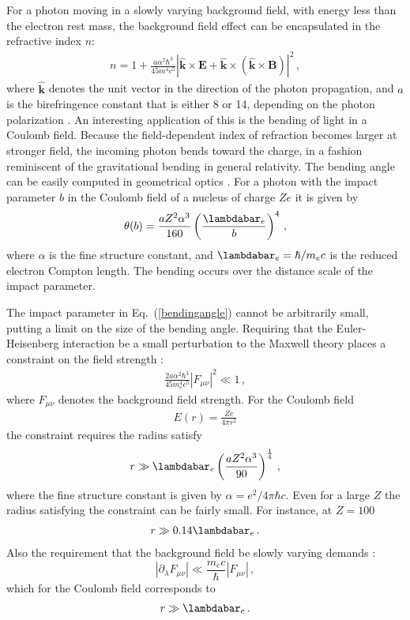 \documentclass[aps,tightenlines,preprint]{revtex4-1}
\newcommand{\bear}{\begin{eqnarray}}
\newcommand{\eear}{\end{eqnarray}}
\begin{document}
 For a 
photon  moving in a 
slowly varying background field,  with energy less than the 
electron rest mass, the background field effect can be encapsulated
in the refractive index $n$:
\bear
n=1+\frac{a\alpha^2\hbar^3}{45m^4c^5}|\bm{\hat{k}}\times 
\bm{E}+\bm{\hat{k}}\times(\bm{\hat{k}}\times \bm{B})|^{2}\,,
\label{index}
\eear
where $\bm{\hat{k}}$ denotes the unit vector in
 the direction of the photon propagation,
 and $a$
 is the birefringence constant 
that is either 8 or 14, depending on the photon polarization 
\cite{bialynicka}.
An interesting application of this is the bending of light in a Coulomb
field.
 Because the field-dependent index of refraction 
becomes larger at  stronger field, the incoming photon bends toward
the charge, in a fashion reminiscent of
the gravitational bending in general relativity. 
The bending angle can be easily
 computed in geometrical optics \cite{lee1}. For a photon with the 
impact parameter $b$ in the Coulomb field of a nucleus
 of charge $Ze$ it is given by 
\bear{} 
\theta(b)=\frac{a Z^{2}\alpha^3}{160} 
\left(\frac{\lambdabar_e}{b}\right)^4\,, 
\label{bendingangle} 
\eear{}
 where $\alpha$ is the fine structure constant, and
 $\lambdabar_{e}=\hbar/m_{e}c$ is 
the reduced electron Compton length. 
The  bending occurs over the distance scale of the
impact parameter.

The impact 
parameter in  Eq.~(\ref{bendingangle}) cannot be arbitrarily small, 
putting a limit on the size of the bending angle. Requiring that the 
Euler-Heisenberg interaction be a small perturbation to the Maxwell 
theory places a constraint on the field strength \cite{bialynicka}: 
\bear{} 
\frac{2a\alpha^{2}\hbar^{3}}{45m_{e}^{4}c^{5}}
 |F_{\mu\nu}|^{2} \ll 1\,, 
\eear{}
 where $F_{\mu\nu}$ denotes the background  field strength. 
For the Coulomb field  
 \bear{} E(r)=\frac{Ze}{4\pi 
r^{2}} 
\label{coulombfield}
\eear{}
 the constraint requires  the radius  satisfy
  \bear{} r\gg 
\lambdabar_{e}\left(\frac{aZ^{2}\alpha^{3}}{90}\right)^{\frac{1}{4}}\,, 
\label{const1}
\eear{} 
where the fine structure constant is given by 
$\alpha=e^{2}/4\pi\hbar c$.
 Even for a large $Z$ the radius satisfying the constraint can be 
fairly small. For instance, at $Z=100$ 
\bear{} r\gg 0.14 \lambdabar_{e}\,. 
\label{const2}
\eear{} 
Also the requirement that the background field be slowly 
varying demands \cite{bialynicka}:
\[ 
|\partial_{\lambda}F_{\mu\nu}|\ll \frac{m_{e}c}{\hbar}
|F_{\mu\nu}|\,,\] 
which for the 
Coulomb field corresponds to 
\bear{} r\gg \lambdabar_{e}\,.{} \label{con1} 
\eear{} 
\end{document}
